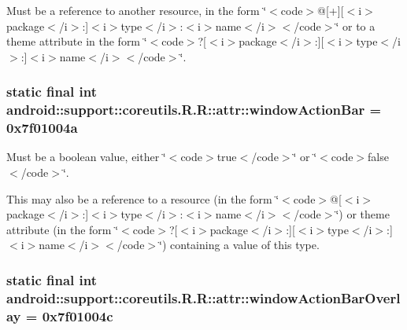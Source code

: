 Must be a reference to another resource, in the form \char`\"{}$<$code$>$@\mbox{[}+\mbox{]}\mbox{[}$<$i$>$package$<$/i$>$:\mbox{]}$<$i$>$type$<$/i$>$:$<$i$>$name$<$/i$>$$<$/code$>$\char`\"{} or to a theme attribute in the form \char`\"{}$<$code$>$?\mbox{[}$<$i$>$package$<$/i$>$:\mbox{]}\mbox{[}$<$i$>$type$<$/i$>$:\mbox{]}$<$i$>$name$<$/i$>$$<$/code$>$\char`\"{}. \hypertarget{classandroid_1_1support_1_1coreutils_1_1_r_1_1attr_20039cdb8c02999af22b475b8dc3b10b}{
\subsubsection[{windowActionBar}]{\setlength{\rightskip}{0pt plus 5cm}static final int android::support::coreutils.R.R::attr::windowActionBar = 0x7f01004a}}
\label{classandroid_1_1support_1_1coreutils_1_1_r_1_1attr_20039cdb8c02999af22b475b8dc3b10b}


Must be a boolean value, either \char`\"{}$<$code$>$true$<$/code$>$\char`\"{} or \char`\"{}$<$code$>$false$<$/code$>$\char`\"{}. 

This may also be a reference to a resource (in the form \char`\"{}$<$code$>$@\mbox{[}$<$i$>$package$<$/i$>$:\mbox{]}$<$i$>$type$<$/i$>$:$<$i$>$name$<$/i$>$$<$/code$>$\char`\"{}) or theme attribute (in the form \char`\"{}$<$code$>$?\mbox{[}$<$i$>$package$<$/i$>$:\mbox{]}\mbox{[}$<$i$>$type$<$/i$>$:\mbox{]}$<$i$>$name$<$/i$>$$<$/code$>$\char`\"{}) containing a value of this type. \hypertarget{classandroid_1_1support_1_1coreutils_1_1_r_1_1attr_75779fd3571790091c879b638d1d8a89}{
\subsubsection[{windowActionBarOverlay}]{\setlength{\rightskip}{0pt plus 5cm}static final int android::support::coreutils.R.R::attr::windowActionBarOverlay = 0x7f01004c}}
\label{classandroid_1_1support_1_1coreutils_1_1_r_1_1attr_75779fd3571790091c879b638d1d8a89}


